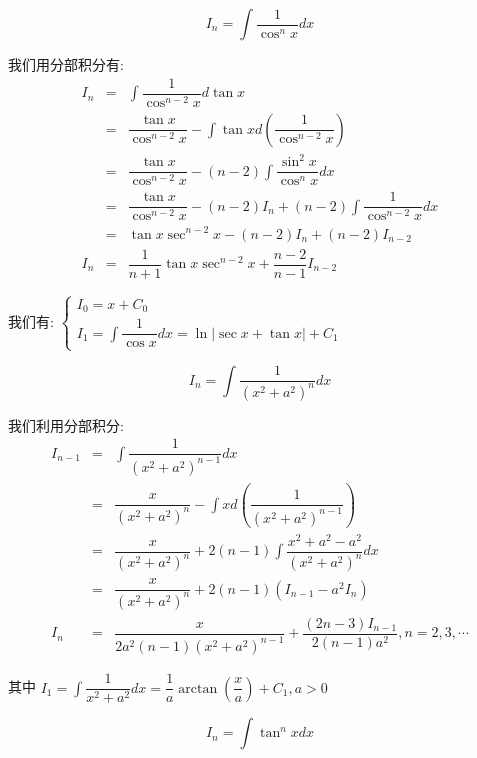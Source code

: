 \begin{theorem}[递归积分]
	\begin{proposition}
		$$I_{n} = \int \dfrac{1}{\cos^{n} x}dx$$ 
	\end{proposition}
	\begin{solution}

		我们用分部积分有: 
		\begin{eqnarray*}
			I_{n} &=& \int \dfrac{1}{\cos^{n-2} x}d\tan x\\
			      &=& \dfrac{\tan x}{\cos^{n-2} x} - \int \tan xd(\dfrac{1}{\cos^{n-2}x})\\
				  &=& \dfrac{\tan x}{\cos^{n-2} x} - (n-2)\int \dfrac{\sin^{2} x}{\cos^{n} x}dx \\
				  &=& \dfrac{\tan x}{\cos^{n-2} x} - (n-2)I_{n} + (n-2)\int \dfrac{1}{\cos^{n-2} x}dx\\
			      &=& \tan x\sec^{n-2}x - (n-2)I_{n} + (n-2)I_{n-2}\\
			I_{n} &=& \dfrac{1}{n+1}\tan x\sec^{n-2}x + \dfrac{n-2}{n-1}I_{n-2}
		\end{eqnarray*}

		我们有: $\begin{cases} I_{0} = x + C_{0} \\ I_{1} = \int \dfrac{1}{\cos x}dx = \ln |\sec x+\tan x| + C_{1} \end{cases}$
	\end{solution}
	\begin{proposition}\label{pro: 递归积分}
		$$I_{n} = \int \dfrac{1}{(x^{2}+a^{2})^{n}}dx$$ 
	\end{proposition}
	\begin{solution}

		我们利用分部积分:
		\begin{eqnarray*}
			I_{n-1} &=& \int \dfrac{1}{(x^{2}+a^{2})^{n-1}}dx\\
			        &=& \dfrac{x}{(x^{2}+a^{2})^{n}} - \int xd(\dfrac{1}{(x^{2}+a^{2})^{n-1}})\\
				    &=& \dfrac{x}{(x^{2}+a^{2})^{n}} + 2(n-1)\int \dfrac{x^{2}+a^{2}-a^{2}}{(x^{2}+a^{2})^{n}}dx\\
				    &=& \dfrac{x}{(x^{2}+a^{2})^{n}} + 2(n-1)(I_{n-1}-a^{2}I_{n})\\
			I_{n} &=& \dfrac{x}{2a^{2}(n-1)(x^{2}+a^{2})^{n-1}} + \dfrac{(2n-3)I_{n-1}}{2(n-1)a^{2}}, n = 2,3,\cdots 
		\end{eqnarray*}

		其中 $I_{1} =\int \dfrac{1}{x^{2}+a^{2}}dx = \dfrac{1}{a}\arctan (\dfrac{x}{a}) +C_{1}, a>0$
	\end{solution}
	\begin{proposition}
		$$I_{n} = \int \tan^{n} xdx$$ 
	\end{proposition}
	\begin{solution}


\end{solution}
\end{theorem}
